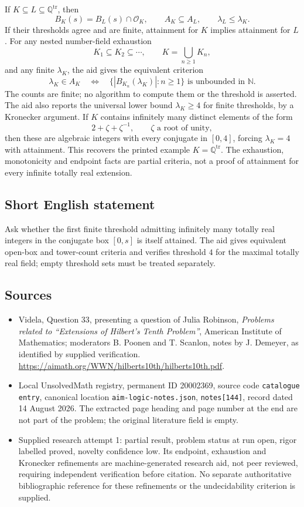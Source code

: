 \documentclass[11pt]{article}
\newcommand{\N}{\mathbb{N}}
\newcommand{\Q}{\mathbb{Q}}
\begin{document}
If $K\subseteq L\subseteq\Q^{\mathrm{tr}}$, then
\[
 B_K(s)=B_L(s)\cap\mathcal O_K,\qquad
 A_K\subseteq A_L,\qquad\lambda_L\le\lambda_K.
\]
If their thresholds agree and are finite, attainment for $K$ implies attainment for $L$. For any nested number-field exhaustion
\[
 K_1\subseteq K_2\subseteq\cdots,\qquad K=\bigcup_{n\ge1}K_n,
\]
and any finite $\lambda_K$, the aid gives the equivalent criterion
\[
 \lambda_K\in A_K
 \quad\Longleftrightarrow\quad
 \bigl\{|B_{K_n}(\lambda_K)|:n\ge1\bigr\}
       \text{ is unbounded in }\N.
\]
The counts are finite; no algorithm to compute them or the threshold is asserted. The aid also reports the universal lower bound $\lambda_K\ge4$ for finite thresholds, by a Kronecker argument. If $K$ contains infinitely many distinct elements of the form
\[
 2+\zeta+\zeta^{-1},\qquad \zeta\text{ a root of unity},
\]
then these are algebraic integers with every conjugate in $[0,4]$, forcing $\lambda_K=4$ with attainment. This recovers the printed example $K=\Q^{\mathrm{tr}}$. The exhaustion, monotonicity and endpoint facts are partial criteria, not a proof of attainment for every infinite totally real extension.
\subsection{Short English statement}
Ask whether the first finite threshold admitting infinitely many totally real integers in the conjugate box $[0,s]$ is itself attained. The aid gives equivalent open-box and tower-count criteria and verifies threshold $4$ for the maximal totally real field; empty threshold sets must be treated separately.
\subsection{Sources}
\begin{itemize}
\item Videla, Question 33, presenting a question of Julia Robinson, \emph{Problems related to ``Extensions of Hilbert's Tenth Problem''}, American Institute of Mathematics; moderators B. Poonen and T. Scanlon, notes by J. Demeyer, as identified by supplied verification. \url{https://aimath.org/WWN/hilberts10th/hilberts10th.pdf}.
\item Local UnsolvedMath registry, permanent ID 20002369, source code \texttt{catalogue entry}, canonical location \texttt{aim-logic-notes.json}, \texttt{notes[144]}, record dated 14 August 2026. The extracted page heading and page number at the end are not part of the problem; the original literature field is empty.
\item Supplied research attempt 1: partial result, problem status at run open, rigor labelled proved, novelty confidence low. Its endpoint, exhaustion and Kronecker refinements are machine-generated research aid, not peer reviewed, requiring independent verification before citation. No separate authoritative bibliographic reference for these refinements or the undecidability criterion is supplied.
\end{itemize}
\end{document}
